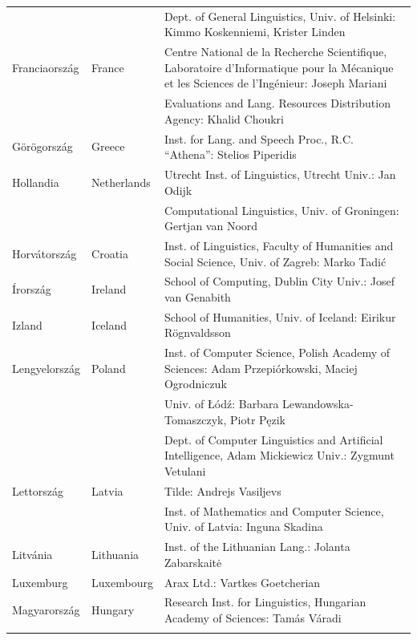 \begin{longtable}{llp{105mm}}
    & & Dept. of General Linguistics, Univ. of Helsinki: Kimmo Koskenniemi, Krister Linden \\ \addlinespace
    Franciaország & \textcolor{grey1}{France} & Centre National de la Recherche Scientifique, Laboratoire d'Informatique pour la Mécanique et les Sciences de l'Ingénieur: Joseph Mariani \\ \addlinespace
    & & Evaluations and Lang. Resources Distribution Agency: Khalid Choukri\\ \addlinespace 
    Görögország & \textcolor{grey1}{Greece} & Inst. for Lang. and Speech Proc., R.C. “Athena”: Stelios Piperidis\\ \addlinespace
     Hollandia & \textcolor{grey1}{Netherlands} & Utrecht Inst. of Linguistics, Utrecht Univ.: Jan Odijk\\ \addlinespace 
    & & Computational Linguistics, Univ. of Groningen: Gertjan van Noord\\ \addlinespace
     Horvátország & \textcolor{grey1}{Croatia} & Inst. of Linguistics, Faculty of Humanities and Social Science, Univ. of Zagreb: Marko Tadić \\ \addlinespace
      Írország & \textcolor{grey1}{Ireland} & School of Computing, Dublin City Univ.: Josef van Genabith\\ \addlinespace
    Izland & \textcolor{grey1}{Iceland} & School of Humanities, Univ. of Iceland: Eirikur Rögnvaldsson\\ \addlinespace
    Lengyelország & \textcolor{grey1}{Poland} & Inst. of Computer Science, Polish Academy of Sciences: Adam Przepiórkowski, Maciej Ogrodniczuk \\ \addlinespace
    & & Univ. of Łódź: Barbara Lewandowska-Tomaszczyk, Piotr Pęzik\\ \addlinespace
    & & Dept. of Computer Linguistics and Artificial Intelligence, Adam Mickiewicz Univ.: Zygmunt Vetulani \\ \addlinespace
    Lettország & \textcolor{grey1}{Latvia} & Tilde: Andrejs Vasiljevs\\ \addlinespace 
    & & Inst. of Mathematics and Computer Science, Univ. of Latvia: Inguna Skadina\\ \addlinespace
    Litvánia & \textcolor{grey1}{Lithuania} & Inst. of the Lithuanian Lang.: Jolanta Zabarskaitė\\ \addlinespace
    Luxemburg & \textcolor{grey1}{Luxembourg} & Arax Ltd.: Vartkes Goetcherian\\ \addlinespace
    Magyarország & \textcolor{grey1}{Hungary} & Research Inst. for Linguistics, Hungarian Academy of Sciences: Tamás Váradi\\  \addlinespace

\end{longtable}
